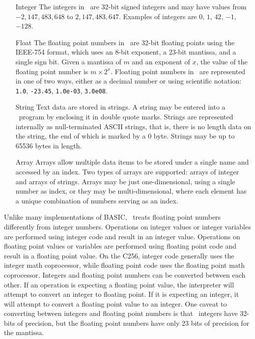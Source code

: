 \documentclass{report}
\begin{document}
    \begin{itemize}
        \item[Integer]  The integers in \BASIC\ are 32-bit signed integers and may have values from $-2,147,483,648$ to $2,147,483,647$.
                        Examples of integers are $0$, $1$, $42$, $-1$, $-128$.

        \item[Float]    The floating point numbers in \BASIC\ are 32-bit floating points using the IEEE-754 format,
                        which uses an 8-bit exponent, a 23-bit mantissa, and a single sign bit. Given a mantissa of $m$ and an exponent of
                        $x$, the value of the floating point number is $m \times 2^x$. Floating point numbers in \BASIC\ are represented in one
                        of two ways, either as a decimal number or using scientific notation:
                        \verb+1.0+, \verb+-23.45+, \verb+1.0e-03+, \verb+3.0e08+.

        \item[String]   Text data are stored in strings. A string may be entered into a \BASIC\ program by enclosing it in double quote marks.
                        Strings are represented internally as null-terminated ASCII strings, that is, there is no length data on the string,
                        the end of which is marked by a 0 byte.
                        Strings may be up to 65536 bytes in length.
                        
        \item[Array]    Arrays allow multiple data items to be stored under a single name and accessed by an index.
                        Two types of arrays are supported: arrays of integer and arrays of strings.
                        Arrays may be just one-dimensional, using a single number as index, or they may be multi-dimensional,
                        where each element has a unique combination of numbers serving as an index.
    \end{itemize}

    Unlike many implementations of BASIC, \BASIC\ treats floating point numbers differently from integer numbers.
    Operations on integer values or integer variables are performed using integer code and result in an integer value.
    Operations on floating point values or variables are performed using floating point code and result in a floating point value.
    On the C256, integer code generally uses the integer math coprocessor, while floating point code uses the floating point math
    coprocessor.
    Integers and floating point numbers can be converted between each other. If an operation is expecting a floating point value,
    the interpreter will attempt to convert an integer to floating point. If it is expecting an integer, it will attempt to
    convert a floating point value to an integer.
    One caveat to converting between integers and floating point numbers is that \BASIC\ integers have 32-bits of precision, but
    the floating point numbers have only 23 bits of precision for the mantissa.
\end{document}
